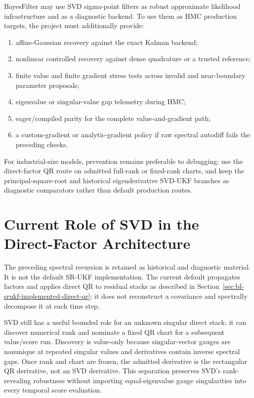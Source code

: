 BayesFilter may use SVD sigma-point filters as robust approximate likelihood
infrastructure and as a diagnostic backend.  To use them as HMC production
targets, the project must additionally provide:
\begin{enumerate}[label=(\roman*)]
  \item affine-Gaussian recovery against the exact Kalman backend;
  \item nonlinear controlled recovery against dense quadrature or a trusted
    reference;
  \item finite value and finite gradient stress tests across invalid and
    near-boundary parameter proposals;
  \item eigenvalue or singular-value gap telemetry during HMC;
  \item eager/compiled parity for the complete value-and-gradient path;
  \item a custom-gradient or analytic-gradient policy if raw spectral autodiff
    fails the preceding checks.
\end{enumerate}
For industrial-size models, prevention remains preferable to debugging: use
the direct-factor QR route on admitted full-rank or fixed-rank charts, and keep
the principal-square-root and historical eigenderivative SVD-UKF branches as
diagnostic comparators rather than default production routes.

\section{Current Role of SVD in the Direct-Factor Architecture}
\label{sec:bf-svd-current-direct-factor-role}

The preceding spectral recursion is retained as historical and diagnostic
material.  It is not the default SR-UKF implementation.  The current default
propagates factors and applies direct QR to residual stacks as described in
Section~\ref{sec:bf-srukf-implemented-direct-qr}; it does not reconstruct a
covariance and spectrally decompose it at each time step.

SVD still has a useful bounded role for an unknown singular direct stack: it
can discover numerical rank and nominate a fixed QR chart for a subsequent
value/score run.  Discovery is value-only because singular-vector gauges are
nonunique at repeated singular values and derivatives contain inverse spectral
gaps.  Once rank and chart are frozen, the admitted derivative is the
rectangular QR derivative, not an SVD derivative.  This separation preserves
SVD's rank-revealing robustness without importing equal-eigenvalue gauge
singularities into every temporal score evaluation.


